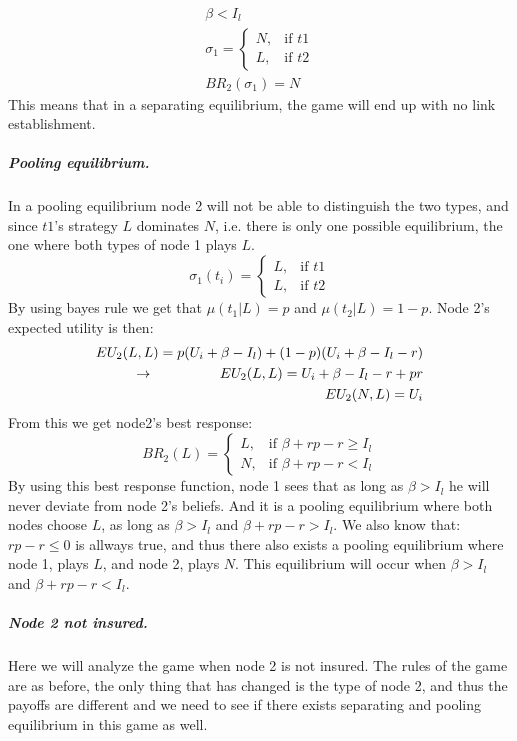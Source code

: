 \begin{eqnarray}
\beta<I_{l}\\
 \sigma_{1}= 
\begin{cases}
   N,& \text{if } t1\\
   L,& \text{if } t2  
\end{cases}\\
BR_{2}(\sigma_{1})=N
\end{eqnarray} 
This means that in a separating equilibrium, the game will end up with no link establishment.
\subparagraph{Pooling equilibrium.}
In a pooling equilibrium node 2 will not be able to distinguish the two types, and since $t1$'s strategy $L$ dominates $N$, i.e. there is only one possible equilibrium, the one where both types of node 1 plays $L$.
\begin{equation}
    \sigma_{1}(t_{i})= 
\begin{cases}
   L,& \text{if } t1\\
   L,& \text{if } t2  
\end{cases}
\label{eq:node2beliefpooling}
\end{equation}
By using bayes rule we get that $\mu(t_{1}|L)=p$ and $\mu(t_{2}|L)=1-p$.
Node 2's expected utility is then:
\begin{eqnarray}
EU_{2}(L,L)=p(U_{i}+\beta-I_{l})+(1-p)(U_{i}+\beta-I_{l}-r)\nonumber\\
\llap{$\rightarrow$\hspace{50pt}}EU_{2}(L,L)=U_{i}+\beta-I_{l}-r+pr\\
EU_{2}(N,L)=U_{i}
\end{eqnarray}
From this we get node2's best response:
\begin{equation}
BR_{2}(L)=
\begin{cases}
L ,& \text{if } \beta + rp-r\geq I_{l} \\
N ,& \text{if } \beta +rp -r < I_{l} 
\end{cases}
\end{equation}
By using this best response function, node 1 sees that as long as $\beta>I_{l}$ he will never deviate from node 2's beliefs. And it is a pooling equilibrium where both nodes choose $L$, as long as $\beta>I_{l}$ and $\beta +rp-r>I_{l}$.
We also know that: $rp-r\leq0$ is allways true, and thus there also exists a pooling equilibrium where node 1, plays $L$, and node 2, plays $N$. This equilibrium will occur when $\beta>I_{l}$ and $\beta+rp-r<I_{l}$.
\subparagraph{Node 2 not insured.}
Here we will analyze the game when node 2 is not insured.
The rules of the game are as before, the only thing that has changed is the type of node 2, and thus the payoffs are different and we need to see if there exists separating and pooling equilibrium in this game as well.

